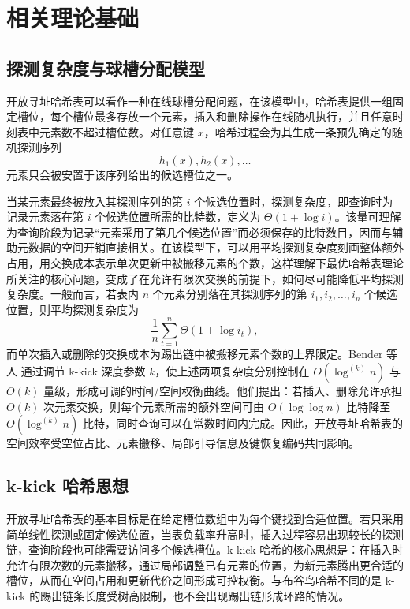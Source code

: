 \chapter{相关理论基础}
\label{ch:theo_base}

\section{探测复杂度与球槽分配模型}

开放寻址哈希表可以看作一种在线球槽分配问题\cite{aamand2021dynamic,bansal2022deletions,mitzenmacher2001}，在该模型中，哈希表提供一组固定槽位，每个槽位最多存放一个元素，插入和删除操作在线随机执行，并且任意时刻表中元素数不超过槽位数。对任意键 \(x\)，哈希过程会为其生成一条预先确定的随机探测序列
\begin{equation}
  h_1(x), h_2(x), \ldots
\end{equation}
元素只会被安置于该序列给出的候选槽位之一。

当某元素最终被放入其探测序列的第 \(i\) 个候选位置时，探测复杂度，即查询时为记录元素落在第 \(i\) 个候选位置所需的比特数，定义为 \(\Theta(1+\log i)\)。该量可理解为查询阶段为记录“元素采用了第几个候选位置”而必须保存的比特数目，因而与辅助元数据的空间开销直接相关。在该模型下，可以用平均探测复杂度刻画整体额外占用，用交换成本表示单次更新中被搬移元素的个数，这样理解下最优哈希表理论所关注的核心问题，变成了在允许有限次交换的前提下，如何尽可能降低平均探测复杂度\cite{bender2022otsh,kuszmaul2024filters,pagh2004linear}。一般而言，若表内 \(n\) 个元素分别落在其探测序列的第 \(i_1,i_2,\ldots,i_n\) 个候选位置，则平均探测复杂度为
\begin{equation}
  \frac{1}{n}\sum_{t=1}^{n}\Theta(1+\log i_t),
\end{equation}
而单次插入或删除的交换成本为踢出链中被搬移元素个数的上界限定。Bender 等人\cite{bender2022otsh} 通过调节 k-kick 深度参数 \(k\)，使上述两项复杂度分别控制在 \(O(\log^{(k)}n)\) 与 \(O(k)\) 量级，形成可调的时间/空间权衡曲线。他们提出：若插入、删除允许承担 \(O(k)\) 次元素交换，则每个元素所需的额外空间可由 \(O(\log\log n)\) 比特降至 \(O(\log^{(k)}n)\) 比特，同时查询可以在常数时间内完成。因此，开放寻址哈希表的空间效率受空位占比、元素搬移、局部引导信息及键恢复编码共同影响。

\section{k-kick 哈希思想}

开放寻址哈希表的基本目标是在给定槽位数组中为每个键找到合适位置。若只采用简单线性探测或固定候选位置，当表负载率升高时，插入过程容易出现较长的探测链，查询阶段也可能需要访问多个候选槽位。k-kick 哈希的核心思想是：在插入时允许有限次数的元素搬移，通过局部调整已有元素的位置，为新元素腾出更合适的槽位，从而在空间占用和更新代价之间形成可控权衡。与布谷鸟哈希\cite{pagh2004cuckoo}不同的是 k-kick 的踢出链条长度受树高限制，也不会出现踢出链形成环路的情况。

